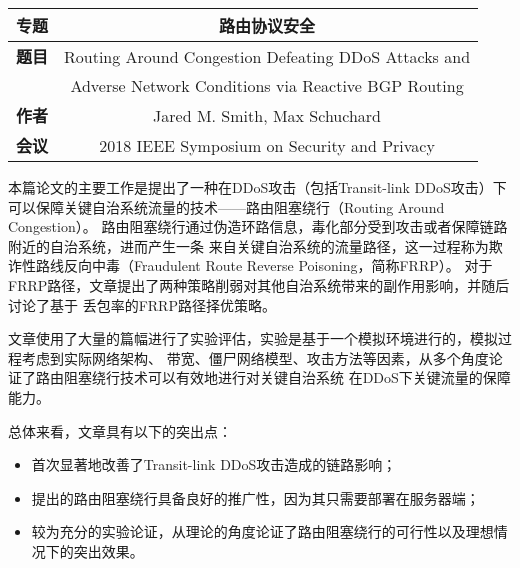 \documentclass[a4paper]{article}
\begin{document}
\courseheader
{}

\info


  
\vspace{-15pt}
\begin{center}
  \begin{tabular}{c|c} \toprule
    \textbf{专题} &路由协议安全 \\\midrule
    \textbf{题目} &Routing Around Congestion Defeating DDoS Attacks and \\& Adverse Network Conditions via Reactive BGP Routing\\
    \textbf{作者} &Jared M. Smith, Max Schuchard\\
    \textbf{会议} &2018 IEEE Symposium on Security and Privacy\\\bottomrule
  \end{tabular}
\end{center}
  
\vspace{20pt}
\setlength{\parindent}{2em}
本篇论文的主要工作是提出了一种在DDoS攻击（包括Transit-link DDoS攻击）下可以保障关键自治系统流量的技术——路由阻塞绕行（Routing Around Congestion）。
路由阻塞绕行通过伪造环路信息，毒化部分受到攻击或者保障链路附近的自治系统，进而产生一条
来自关键自治系统的流量路径，这一过程称为欺诈性路线反向中毒（Fraudulent Route Reverse Poisoning，简称FRRP）。
对于FRRP路径，文章提出了两种策略削弱对其他自治系统带来的副作用影响，并随后讨论了基于
丢包率的FRRP路径择优策略。

文章使用了大量的篇幅进行了实验评估，实验是基于一个模拟环境进行的，模拟过程考虑到实际网络架构、
带宽、僵尸网络模型、攻击方法等因素，从多个角度论证了路由阻塞绕行技术可以有效地进行对关键自治系统
在DDoS下关键流量的保障能力。

总体来看，文章具有以下的突出点：
\begin{itemize}
  \item 首次显著地改善了Transit-link DDoS攻击造成的链路影响；
  \item 提出的路由阻塞绕行具备良好的推广性，因为其只需要部署在服务器端；
  \item 较为充分的实验论证，从理论的角度论证了路由阻塞绕行的可行性以及理想情况下的突出效果。
\end{itemize}
\end{document}
